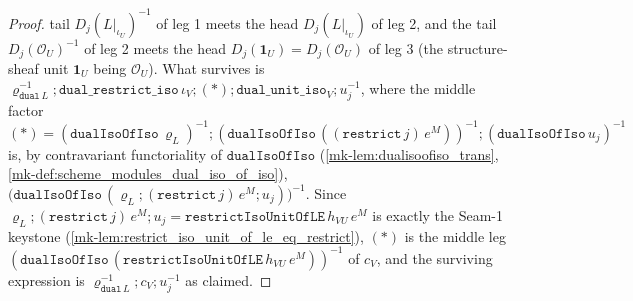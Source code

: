 \begin{proof}
  tail \(D_j(L|_{\iota_U})^{-1}\) of leg 1 meets the head \(D_j(L|_{\iota_U})\) of leg 2, and the tail
  \(D_j(\mathcal O_U)^{-1}\) of leg 2 meets the head \(D_j(\mathbf 1_U) = D_j(\mathcal O_U)\) of leg 3
  (the structure-sheaf unit \(\mathbf 1_U\) being \(\mathcal O_U\)). What survives is
  \(\varrho_{\mathtt{dual}\,L}^{-1} \mathbin{;} \mathtt{dual\_restrict\_iso}\,\iota_V \mathbin{;} (\ast)
  \mathbin{;} \mathtt{dual\_unit\_iso}_V \mathbin{;} u_j^{-1}\), where the middle factor
  \((\ast) = (\mathtt{dualIsoOfIso}\,\varrho_L)^{-1} \mathbin{;}
  (\mathtt{dualIsoOfIso}\,((\mathtt{restrict}\,j)\,e^M))^{-1} \mathbin{;} (\mathtt{dualIsoOfIso}\,u_j)^{-1}\)
  is, by contravariant functoriality of \(\mathtt{dualIsoOfIso}\) (\ref{mk-lem:dualisoofiso_trans},
  \ref{mk-def:scheme_modules_dual_iso_of_iso}),
  \(\bigl(\mathtt{dualIsoOfIso}\,(\varrho_L \mathbin{;} (\mathtt{restrict}\,j)\,e^M \mathbin{;} u_j)\bigr)^{-1}\).
  Since \(\varrho_L \mathbin{;} (\mathtt{restrict}\,j)\,e^M \mathbin{;} u_j
    = \mathtt{restrictIsoUnitOfLE}\,h_{VU}\,e^M\) is exactly the Seam-1 keystone
  (\ref{mk-lem:restrict_iso_unit_of_le_eq_restrict}), \((\ast)\) is the middle leg
  \((\mathtt{dualIsoOfIso}\,(\mathtt{restrictIsoUnitOfLE}\,h_{VU}\,e^M))^{-1}\) of \(c_V\), and the
  surviving expression is \(\varrho_{\mathtt{dual}\,L}^{-1} \mathbin{;} c_V \mathbin{;} u_j^{-1}\) as claimed.
\end{proof}

